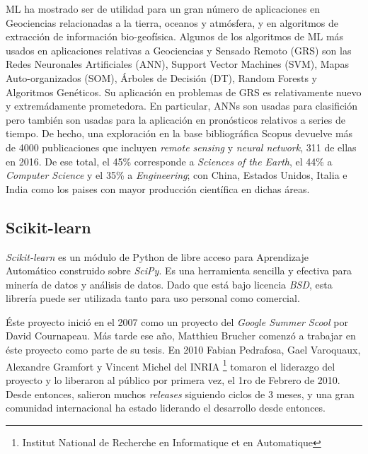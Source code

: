   ML ha mostrado ser de utilidad para un gran número de aplicaciones en Geociencias
  relacionadas a la tierra, oceanos y atmósfera, y en algoritmos de extracción
  de información bio-geofísica.
  Algunos de los algoritmos de ML más usados en aplicaciones relativas a
  Geociencias y Sensado Remoto (GRS) son las Redes Neuronales Artificiales (ANN),
  Support Vector Machines (SVM), Mapas Auto-organizados (SOM), Árboles de Decisión (DT),
  Random Forests y Algoritmos Genéticos. Su aplicación en problemas de GRS es
  relativamente nuevo y extremádamente prometedora. En particular, ANNs son
  usadas para clasifición pero también son usadas para la aplicación en pronósticos
  relativos a series de tiempo.
  De hecho, una exploración en la base bibliográfica Scopus devuelve más de 4000
  publicaciones que incluyen \textit{remote sensing} y \textit{neural network},
  311 de ellas en 2016. De ese total, el 45\% corresponde a
  \textit{Sciences of the Earth}, el 44\% a \textit{Computer Science} y el 35\% a
  \textit{Engineering}; con China, Estados Unidos, Italia e India como los paises
  con mayor producción científica en dichas áreas.


\subsection{Scikit-learn}

  \par \textit{Scikit-learn}\cite{scikit-learn, sklearn_review} es un módulo
    de Python de libre acceso para Aprendizaje Automático
    construido sobre \textit{SciPy}\cite{scipy}. Es una herramienta
    sencilla y efectiva para minería de datos y análisis de datos. Dado que está bajo
    licencia \textit{BSD}, esta librería puede ser utilizada tanto
    para uso personal como comercial.

  \par Éste proyecto inició en el 2007 como un proyecto del \textit{Google Summer Scool} por David
    Cournapeau. Más tarde ese año, Matthieu Brucher comenzó a trabajar en éste proyecto
    como parte de su tesis. En 2010 Fabian Pedrafosa, Gael Varoquaux, Alexandre
    Gramfort y Vincent Michel del INRIA \footnote{Institut National de Recherche
    en Informatique et en Automatique} tomaron el liderazgo del proyecto y lo liberaron
    al público por primera vez, el 1ro de Febrero de 2010. Desde entonces, salieron muchos
    \textit{releases} siguiendo ciclos de 3 meses, y una gran comunidad internacional
    ha estado liderando el desarrollo desde entonces.

